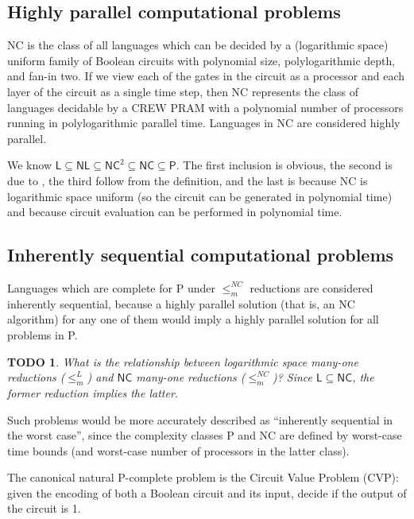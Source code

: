 \documentclass{article}
\newtheorem{todo}{TODO}
\begin{document}
\subsection{Highly parallel computational problems}\label{sec:definenc}

\textsf{NC}{} is the class of all languages which can be decided by a (logarithmic space) uniform family of Boolean circuits with polynomial size, polylogarithmic depth, and fan-in two.
If we view each of the gates in the circuit as a processor and each layer of the circuit as a single time step, then \textsf{NC} represents the class of languages decidable by a CREW PRAM with a polynomial number of processors running in polylogarithmic parallel time.
Languages in \textsf{NC} are considered highly parallel.

We know $\mathsf{L}\subseteq\mathsf{NL}\subseteq\mathsf{NC}^2\subseteq\mathsf{NC}\subseteq\mathsf{P}$.
The first inclusion is obvious, the second is due to \cite{borodin77}, the third follow from the definition, and the last is because \textsf{NC} is logarithmic space uniform (so the circuit can be generated in polynomial time) and because circuit evaluation can be performed in polynomial time.

\subsection{Inherently sequential computational problems}

Languages which are complete for \textsf{P} under $\leq_m^{NC}$ reductions are considered inherently sequential, because a highly parallel solution (that is, an \textsf{NC} algorithm) for any one of them would imply a highly parallel solution for all problems in \textsf{P}.
\begin{todo}
  What is the relationship between logarithmic space many-one reductions ($\leq_m^L$) and $\mathsf{NC}$ many-one reductions ($\leq_m^{NC}$)?
  Since $\mathsf{L}\subseteq\mathsf{NC}$, the former reduction implies the latter.
\end{todo}
Such problems would be more accurately described as ``inherently sequential in the worst case'', since the complexity classes \textsf{P} and \textsf{NC} are defined by worst-case time bounds (and worst-case number of processors in the latter class).

The canonical natural \textsf{P}-complete problem is the Circuit Value Problem (CVP): given the encoding of both a Boolean circuit and its input, decide if the output of the circuit is 1.
\end{document}
